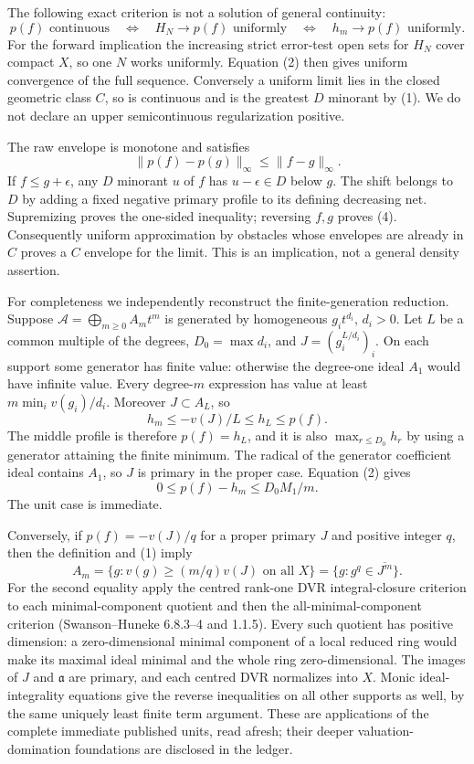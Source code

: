 \documentclass[11pt]{article}
\begin{document}
The following exact criterion is not a solution of general continuity:
\[
 p(f)\text{ continuous}\quad\Longleftrightarrow\quad H_N\to p(f)\text{ uniformly}
 \quad\Longleftrightarrow\quad h_m\to p(f)\text{ uniformly}. \tag{3}
\]
For the forward implication the increasing strict error-test open sets for $H_N$ cover compact $X$, so one $N$ works uniformly. Equation (2) then gives uniform convergence of the full sequence. Conversely a uniform limit lies in the closed geometric class $C$, so is continuous and is the greatest $D$ minorant by (1). We do not declare an upper semicontinuous regularization positive.

The raw envelope is monotone and satisfies
\[
 \|p(f)-p(g)\|_\infty\le\|f-g\|_\infty. \tag{4}
\]
If $f\le g+\epsilon$, any $D$ minorant $u$ of $f$ has $u-\epsilon\in D$ below $g$. The shift belongs to $D$ by adding a fixed negative primary profile to its defining decreasing net. Supremizing proves the one-sided inequality; reversing $f,g$ proves (4). Consequently uniform approximation by obstacles whose envelopes are already in $C$ proves a $C$ envelope for the limit. This is an implication, not a general density assertion.

For completeness we independently reconstruct the finite-generation reduction. Suppose $\mathcal A=\bigoplus_{m\ge0}A_mt^m$ is generated by homogeneous $g_it^{d_i}$, $d_i>0$. Let $L$ be a common multiple of the degrees, $D_0=\max d_i$, and $J=(g_i^{L/d_i})_i$. On each support some generator has finite value: otherwise the degree-one ideal $A_1$ would have infinite value. Every degree-$m$ expression has value at least $m\min_i v(g_i)/d_i$. Moreover $J\subset A_L$, so
\[
 h_m\le -v(J)/L\le h_L\le p(f).
\]
The middle profile is therefore $p(f)=h_L$, and it is also $\max_{r\le D_0}h_r$ by using a generator attaining the finite minimum. The radical of the generator coefficient ideal contains $A_1$, so $J$ is primary in the proper case. Equation (2) gives
\[
 0\le p(f)-h_m\le D_0M_1/m. \tag{5}
\]
The unit case is immediate.

Conversely, if $p(f)=-v(J)/q$ for a proper primary $J$ and positive integer $q$, then the definition and (1) imply
\[
 A_m=\{g:v(g)\ge (m/q)v(J)\text{ on all }X\}
     =\{g:g^q\in\overline{J^m}\}. \tag{6}
\]
For the second equality apply the centred rank-one DVR integral-closure criterion to each minimal-component quotient and then the all-minimal-component criterion (Swanson--Huneke 6.8.3--4 and 1.1.5). Every such quotient has positive dimension: a zero-dimensional minimal component of a local reduced ring would make its maximal ideal minimal and the whole ring zero-dimensional. The images of $J$ and $\mathfrak a$ are primary, and each centred DVR normalizes into $X$. Monic ideal-integrality equations give the reverse inequalities on all other supports as well, by the same uniquely least finite term argument. These are applications of the complete immediate published units, read afresh; their deeper valuation-domination foundations are disclosed in the ledger.
\end{document}
